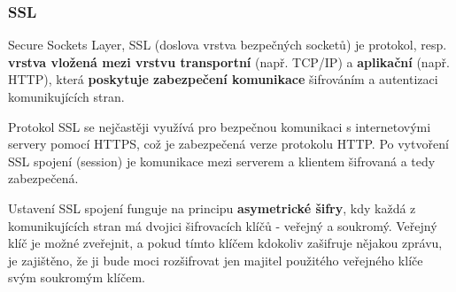 \subsubsection{SSL}
Secure Sockets Layer, SSL (doslova vrstva bezpečných socketů) je protokol, resp. \textbf{vrstva vložená mezi vrstvu transportní} (např. TCP/IP) a \textbf{aplikační} (např. HTTP), která \textbf{poskytuje zabezpečení komunikace} šifrováním a autentizaci komunikujících stran.

Protokol SSL se nejčastěji využívá pro bezpečnou komunikaci s internetovými servery pomocí HTTPS, což je zabezpečená verze protokolu HTTP. Po vytvoření SSL spojení (session) je komunikace mezi serverem a klientem šifrovaná a tedy zabezpečená.

Ustavení SSL spojení funguje na principu \textbf{asymetrické šifry}, kdy každá z komunikujících stran má dvojici šifrovacích klíčů - veřejný a soukromý. Veřejný klíč je možné zveřejnit, a pokud tímto klíčem kdokoliv zašifruje nějakou zprávu, je zajištěno, že ji bude moci rozšifrovat jen majitel použitého veřejného klíče svým soukromým klíčem.

